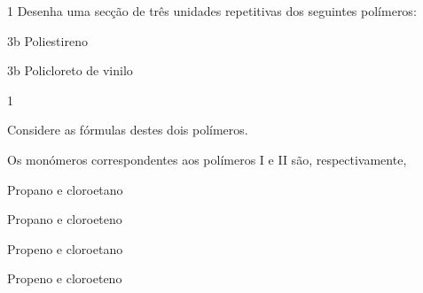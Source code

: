 \documentclass[\mainfilename]{subfiles}
\begin{document}
\begin{questionBox}1{ %
    Desenha uma secção de três unidades repetitivas dos seguintes polímeros:
} %
    \begin{questionBox}3b{ %
        Poliestireno
    } %
        \begin{center}
        \end{center}
        \answer{}
    \end{questionBox}
    \begin{questionBox}3b{ %
        Policloreto de vinilo
    } %
        \begin{center}
        \end{center}
        \answer{}
    \end{questionBox}
\end{questionBox}

\begin{questionBox}1{ %
    Considere as fórmulas destes dois polímeros.
    \begin{center}
    \end{center}
    Os monómeros correspondentes aos polímeros I e II são, respectivamente,
} %
    \begin{enumerate}[label=\alph{enumi}.]
        \def\pano{\textcolor{Graph21}{Propano}}
        \def\peno{\textcolor{Graph22}{Propeno}}
        \def\cano{\textcolor{Graph21}{cloroetano}}
        \def\ceno{\textcolor{Graph22}{cloroeteno}}
        \begin{multicols}{2}
            \item \pano{} e \cano
            \item \pano{} e \ceno
            \item \peno{} e \cano
            \item \peno{} e \ceno
        \end{multicols}
    \end{enumerate}
\end{questionBox}
\end{document}
